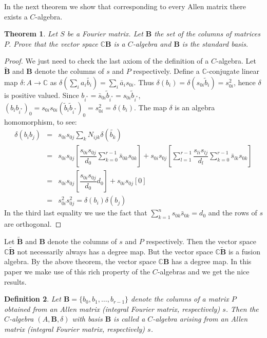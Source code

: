 \documentclass[12pt]{amsart}
\newtheorem{thm}{Theorem}
\newtheorem{definition}[thm]{Definition}
\begin{document}
In the next theorem we show that corresponding to every Allen matrix there exists a $C$-algebra.

\begin{thm}Let $S$ be a Fourier matrix. Let ${{\mathbf B}}$ the set of the columns of matrices $P$. Prove that the vector space ${{\mathbb C}}{{\mathbf B}}$ is a $C$-algebra and ${{\mathbf B}}$ is the standard basis.
\end{thm}

\begin{proof}We just need to check the last axiom of the definition of a $C$-algebra. Let $\tilde {{\mathbf B}}$ and ${{\mathbf B}}$ denote the columns of $s$ and $P$ respectively. Define a ${{\mathbb C}}$-conjugate linear map $\delta:A\longrightarrow {{\mathbb C}}$  as  $\delta(\sum_ia_i\tilde{b_i})=\sum_i\bar a_is_{0i}$. Thus $\delta(b_i)= \delta(s_{0i}\tilde b_{i}) = s^2_{0i}$, hence $\delta$ is positive valued. Since $b_{i^*}= \bar s_{0i}\tilde{b}_{i^*}=s_{0i}\tilde{b}_{i^*}$, $(b_ib_{i^*})_0=s_{0i}s_{0i}(\tilde b_i \tilde b_{i^*})_0= s^2_{0i}=\delta(b_i)$. The map $\delta$ is an algebra homomorphism, to see:
$$\begin{array}{rcl}\delta(b_i b_j)&=&
s_{0i}s_{0j}\sum\limits^{}_{k}N_{ijk}\delta(\tilde{b_k})
\\&=&s_{0i}s_{0j}[\dfrac{s_{0i}s_{0j}}{d_0} \sum\limits^{r-1}_{k=0}\bar s_{0k}s_{0k}]+s_{0i}s_{0j}[\sum\limits^{r-1}_{l=1}\dfrac{s_{li}s_{lj}}{d_l}
\sum\limits^{r-1}_{k=0}\bar s_{lk}s_{0k}]
\\&=&s_{0i}s_{0j}[\dfrac{s_{0i}s_{0j}}{d_0} d_0]+s_{0i}s_{0j}[0]
\\&=&s^2_{0i}s^2_{0j}=\delta(b_i)\delta(b_j)\end{array}$$
In the third last equality we use the fact that $ \sum\limits^{n}_{k=1} s_{0k}\bar  s_{0k} =d_0$ and the rows of $s$ are orthogonal.
\end{proof}

Let $\tilde {{\mathbf B}}$ and ${{\mathbf B}}$ denote the columns of $s$ and $P$ respectively.  Then the vector space ${{\mathbb C}}\tilde{{\mathbf B}}$ not necessarily always has a degree map. But the vector space ${{\mathbb C}}\tilde{{\mathbf B}}$ is a fusion algebra. By the above theorem, the vector space ${{\mathbb C}}{{\mathbf B}}$ has a degree map. In this paper we make use of this rich property of the $C$-algebras and we get the nice results.

\begin{definition} Let ${{\mathbf B}}=\{b_0,b_1,\hdots, b_{r-1}\}$ denote the columns of a matrix $P$ obtained from an Allen matrix (integral Fourier matrix, respectively) $s$. Then the $C$-algebra $(A,{{\mathbf B}}, \delta)$ with basis ${{\mathbf B}}$ is called a $C$-algebra arising from an Allen matrix (integral Fourier matrix, respectively) $s$.
\end{definition}
\end{document}

